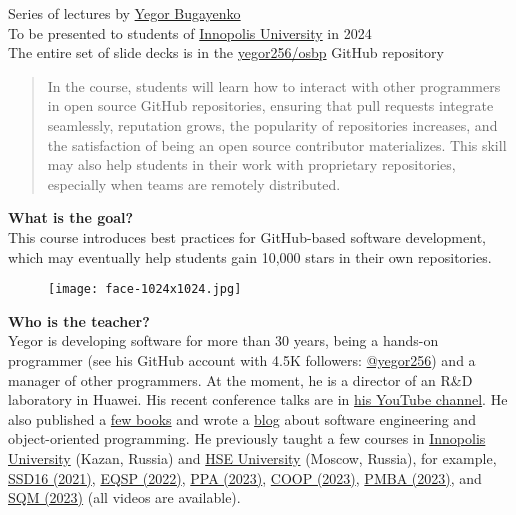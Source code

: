 \documentclass[nobrand,anonymous,nodate,nosecurity]{huawei}
\begin{document}

{

Series of lectures by \href{https://www.yegor256.com}{Yegor Bugayenko} \\
To be presented to students of \href{https://innopolis.university/en/}{Innopolis University} in 2024
\\
The entire set of slide decks is in the \href{https://github.com/yegor256/osbp}{yegor256/osbp} GitHub repository

\begin{abstract}
In the course, students will learn how to interact with other programmers in open source GitHub repositories, ensuring that pull requests integrate seamlessly, reputation grows, the popularity of repositories increases, and the satisfaction of being an open source contributor materializes. This skill may also help students in their work with proprietary repositories, especially when teams are remotely distributed.
\end{abstract}

\textbf{What is the goal?}\\
This course introduces best practices for GitHub-based software development, which may eventually help students gain 10,000 stars in their own repositories.

\begin{wrapfigure}{r}{1.2in}%
\raggedleft%
\texttt{[image: face-1024x1024.jpg]}%
\end{wrapfigure}
\textbf{Who is the teacher?}\\
Yegor is developing software for more than 30 years, being a hands-on programmer
(see his GitHub account with 4.5K followers: \href{https://github.com/yegor256}{@yegor256})
and a manager of other programmers. At the moment, he is a director
of an R\&D laboratory in Huawei. His recent conference talks are in
\href{https://www.youtube.com/channel/UCr9qCdqXLm2SU0BIs6d_68Q}{his YouTube channel}.
He also published a \href{https://www.yegor256.com/books.html}{few books}
and wrote a \href{https://www.yegor256.com/contents.html}{blog} about software engineering
and object-oriented programming.
He previously taught a few courses in
\href{https://innopolis.university/}{Innopolis University} (Kazan, Russia)
and
\href{https://hse.ru}{HSE University} (Moscow, Russia),
for example,
\href{https://github.com/yegor256/ssd16}{SSD16 (2021)},
\href{https://github.com/yegor256/eqsp}{EQSP (2022)},
\href{https://github.com/yegor256/ppa}{PPA (2023)},
\href{https://github.com/yegor256/painofoop}{COOP (2023)},
\href{https://github.com/yegor256/pmba}{PMBA (2023)},
and
\href{https://github.com/yegor256/sqm}{SQM (2023)}
(all videos are available).

}
\end{document}
